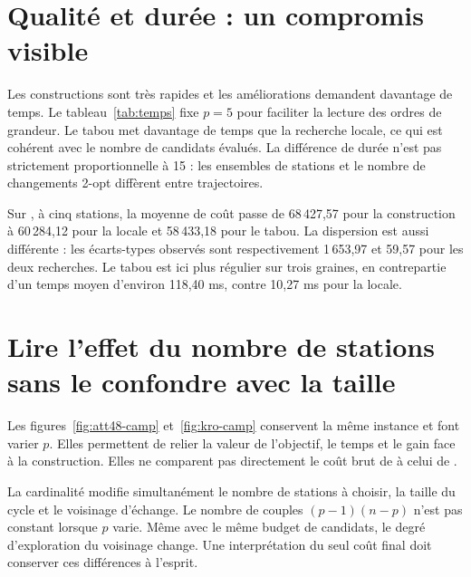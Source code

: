 \section{Qualité et durée : un compromis visible}
Les constructions sont très rapides et les améliorations demandent davantage
de temps. Le tableau~\ref{tab:temps} fixe $p=5$ pour faciliter la lecture des
ordres de grandeur. Le tabou met davantage de temps que la recherche locale,
ce qui est cohérent avec le nombre de candidats évalués. La différence de
durée n'est pas strictement proportionnelle à 15 : les ensembles de stations
et le nombre de changements 2-opt diffèrent entre trajectoires.

\begin{table}[htbp]\centering

\caption{Temps moyens observés à $p=5$ et $\alpha=1$, en millisecondes ; une exécution
pour la construction, trois graines pour les recherches.}
\label{tab:temps}\sourcetable
\end{table}

Sur , à cinq stations, la moyenne de coût passe de 68\,427,57
pour la construction à 60\,284,12 pour la locale et 58\,433,18 pour le tabou.
La dispersion est aussi différente : les écarts-types observés sont
respectivement 1\,653,97 et 59,57 pour les deux recherches. Le tabou est ici
plus régulier sur trois graines, en contrepartie d'un temps moyen d'environ
118,40 ms, contre 10,27 ms pour la locale.

\section{Lire l'effet du nombre de stations sans le confondre avec la taille}
Les figures~\ref{fig:att48-camp} et~\ref{fig:kro-camp} conservent la même
instance et font varier $p$. Elles permettent de relier la valeur de l'objectif,
le temps et le gain face à la construction. Elles ne comparent pas directement
le coût brut de  à celui de .

La cardinalité modifie simultanément le nombre de stations à choisir, la
taille du cycle et le voisinage d'échange. Le nombre de couples
$(p-1)(n-p)$ n'est pas constant lorsque $p$ varie. Même avec le même budget
de candidats, le degré d'exploration du voisinage change. Une interprétation
du seul coût final doit conserver ces différences à l'esprit.


\FloatBarrier
